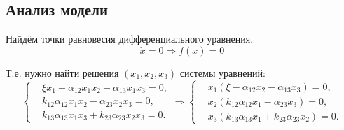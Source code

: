 \subsection{Анализ модели}
    Найдём точки равновесия дифференциального уравнения.
    \[
        \dot{x} = 0 \Rightarrow f(x) = 0
    \]

    Т.е. нужно найти решения \( (x_1, x_2, x_3) \) системы уравнений:
    \[
        \left\{\begin{split}
            & \xi x_1 - \alpha_{12} x_1 x_2 - \alpha_{13} x_1 x_3 = 0, \\
            & k_{12} \alpha_{12} x_1 x_2 - \alpha_{23} x_2 x_3 = 0, \\
            & k_{13} \alpha_{13} x_1 x_3 + k_{23} \alpha_{23} x_2 x_3 = 0. 
        \end{split}\right.
        \Rightarrow
        \left\{\begin{split}
            & x_1 (\xi - \alpha_{12} x_2 - \alpha_{13} x_3) = 0, \\
            & x_2 (k_{12} \alpha_{12} x_1 - \alpha_{23} x_3) = 0, \\
            & x_3 (k_{13} \alpha_{13} x_1 + k_{23} \alpha_{23} x_2) = 0. 
        \end{split}\right.
    \]

